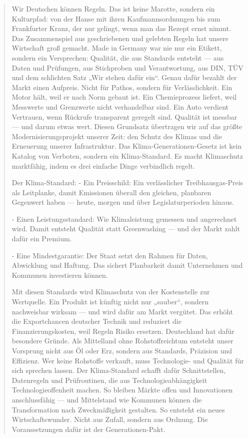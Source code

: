 \documentclass[12pt,a4paper]{scrartcl}
\begin{document}
\begin{quote}
Wir Deutschen können Regeln. Das ist keine Marotte, sondern ein Kulturpfad: von der Hanse mit ihren Kaufmannsordnungen bis zum Frankfurter Kranz, der nur gelingt, wenn man das Rezept ernst nimmt. Das Zusammenspiel aus geschriebenen und gelebten Regeln hat unsere Wirtschaft groß gemacht. Made in Germany war nie nur ein Etikett, sondern ein Versprechen: Qualität, die aus Standards entsteht --- aus Daten und Prüfungen, aus Stichproben und Verantwortung, aus DIN, TÜV und dem schlichten Satz „Wir stehen dafür ein“. Genau dafür bezahlt der Markt einen Aufpreis. Nicht für Pathos, sondern für Verlässlichkeit. Ein Motor hält, weil er nach Norm gebaut ist. Ein Chemieprozess liefert, weil Messwerte und Grenzwerte nicht verhandelbar sind. Ein Auto verdient Vertrauen, wenn Rückrufe transparent geregelt sind. Qualität ist messbar --- und darum etwas wert. Diesen Grundsatz übertragen wir auf das größte Modernisierungsprojekt unserer Zeit: den Schutz des Klimas und die Erneuerung unserer Infrastruktur. Das Klima-Generationen-Gesetz ist kein Katalog von Verboten, sondern ein Klima-Standard. Es macht Klimaschutz marktfähig, indem es drei einfache Dinge verbindlich regelt.

 Der Klima-Standard:
- Ein Preisschild: Ein verlässlicher Treibhausgas-Preis als Leitplanke, damit Emissionen überall den gleichen, planbaren Gegenwert haben --- heute, morgen und über Legislaturperioden hinaus.

- Einen Leistungsstandard: Wie Klimaleistung gemessen und angerechnet wird. Damit entsteht Qualität statt Greenwashing --- und der Markt zahlt dafür ein Premium.

- Eine Mindestgarantie: Der Staat setzt den Rahmen für Daten, Abwicklung und Haftung. Das sichert Planbarkeit damit Unternehmen und Kommunen investieren können.
 
  Mit diesen Standards wird Klimaschutz von der Kostenstelle zur Wertquelle. Ein Produkt ist künftig nicht nur „sauber“, sondern nachweisbar wirksam --- und wird dafür am Markt vergütet. Das erhöht die Exportchancen deutscher Technik und reduziert die Finanzierungskosten, weil Regeln Risiko ersetzen. Deutschland hat dafür besondere Gründe. Als Mittelland ohne Rohstoffreichtum entsteht unser Vorsprung nicht aus Öl oder Erz, sondern aus Standards, Präzision und Effizienz. Wer keine Rohstoffe verkauft, muss Technologie- und Qualität für sich sprechen lassen. Der Klima-Standard schafft dafür Schnittstellen, Datenregeln und Prüfroutinen, die aus Technologieabhängigkeit Technologieoffenheit machen. So bleiben Märkte offen und Innovationen anschlussfähig --- und Mittelstand wie Kommunen können die Transformation nach Zweckmäßigkeit gestalten. So entsteht ein neues Wirtschaftswunder. Nicht aus Zufall, sondern aus Ordnung. Die Voraussetzungen dafür ist der Generationen-Pakt.


\end{quote}
\end{document}
